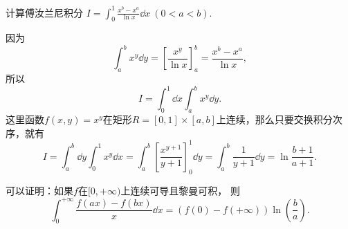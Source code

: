 \begin{example}
计算傅汝兰尼积分
\(I = \int_0^1 \frac{x^b-x^a}{\ln x} \dd{x}\ (0<a<b)\).
\begin{solution}
因为\begin{equation*}
	\int_a^b x^y \dd{y}
	= \left[ \frac{x^y}{\ln x} \right]_a^b
	= \frac{x^b - x^a}{\ln x},
\end{equation*}
所以\begin{equation*}
	I = \int_0^1 \dd{x} \int_a^b x^y \dd{y}.
\end{equation*}
这里函数\(f(x,y) = x^y\)在矩形\(R=[0,1]\times[a,b]\)上连续，那么只要交换积分次序，就有\begin{equation*}
	I = \int_a^b \dd{y} \int_0^1 x^y \dd{x}
	= \int_a^b \left[\frac{x^{y+1}}{y+1}\right]_0^1 \dd{y}
	= \int_a^b \frac{1}{y+1} \dd{y}
	= \ln\frac{b+1}{a+1}.
\end{equation*}
\end{solution}
\end{example}
\begin{remark}
可以证明：如果\(f\)在\([0,+\infty)\)上连续可导且黎曼可积，
则\begin{equation}
	\int_0^{+\infty} \frac{f(ax)-f(bx)}{x} \dd{x} = (f(0)-f(+\infty)) \ln(\frac{b}{a}).
\end{equation}
\end{remark}

